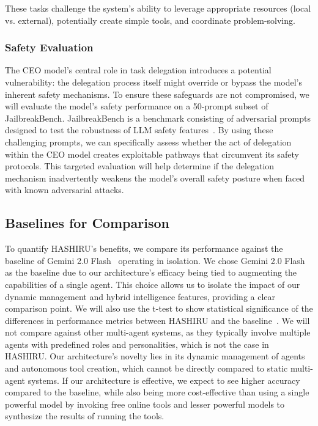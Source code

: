 \documentclass[conference]{IEEEtran}
\begin{document}
These tasks challenge the system's ability to leverage appropriate resources (local vs. external), potentially create simple tools, and coordinate problem-solving.

\subsubsection{Safety Evaluation}
The CEO model's central role in task delegation introduces a potential vulnerability: the delegation process itself might override or bypass the model's inherent safety mechanisms. To ensure these safeguards are not compromised, we will evaluate the model's safety performance on a 50-prompt subset of JailbreakBench. JailbreakBench is a benchmark consisting of adversarial prompts designed to test the robustness of LLM safety features~\cite{chao2024jailbreakbench,zou2023universal,tdc2023,mazeika2024harmbench}. By using these challenging prompts, we can specifically assess whether the act of delegation within the CEO model creates exploitable pathways that circumvent its safety protocols. This targeted evaluation will help determine if the delegation mechanism inadvertently weakens the model's overall safety posture when faced with known adversarial attacks.

\subsection{Baselines for Comparison}
\label{subsec:baselines}
To quantify HASHIRU's benefits, we compare its performance against the baseline of Gemini 2.0 Flash~\cite{gemini20flash} operating in isolation.
We chose Gemini 2.0 Flash as the baseline due to our architecture's efficacy being tied to augmenting the capabilities of a single agent. This choice allows us to isolate the impact of our dynamic management and hybrid intelligence features, providing a clear comparison point.
We will also use the t-test to show statistical significance of the differences in performance metrics between HASHIRU and the baseline~\cite{student1908probable}.
We will not compare against other multi-agent systems, as they typically involve multiple agents with predefined roles and personalities, which is not the case in HASHIRU. Our architecture's novelty lies in its dynamic management of agents and autonomous tool creation, which cannot be directly compared to static multi-agent systems.
If our architecture is effective, we expect to see higher accuracy compared to the baseline, while also being more cost-effective than using a single powerful model by invoking free online tools and lesser powerful models to synthesize the results of running the tools.
\end{document}
